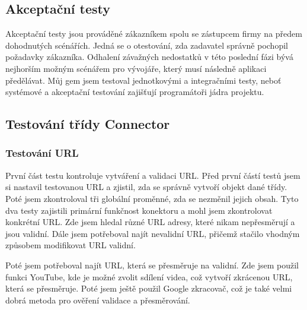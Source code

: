 \subsection{Akceptační testy}
\par Akceptační testy jsou prováděné zákazníkem spolu se zástupcem firmy na předem dohodnutých scénářích. Jedná se o otestování, zda zadavatel správně pochopil požadavky zákazníka. Odhalení závažných nedostatků v této poslední fázi bývá nejhorším možným scénářem pro vývojáře, který musí následně aplikaci předělávat. Můj gem jsem testoval jednotkovými a integračními testy, neboť systémové a akceptační testování zajišťují programátoři jádra projektu.


\subsection{Testování třídy Connector}
\subsubsection{Testování URL}
\par První část testu kontroluje vytváření a validaci URL. Před první částí testů jsem si nastavil testovanou URL a zjistil, zda se správně vytvoří objekt dané třídy. Poté jsem zkontroloval tři globální proměnné, zda se nezměnil jejich obsah. Tyto dva testy zajistili primární funkčnost konektoru a mohl jsem zkontrolovat konkrétní URL. Zde jsem hledal různé URL adresy, které nikam nepřesměrují a jsou validní. Dále jsem potřeboval najít nevalidní URL, přičemž stačilo vhodným způsobem modifikovat URL validní. 
\par Poté jsem potřeboval najít URL, která se přesměruje na validní. Zde jsem použil funkci YouTube, kde je možné zvolit sdílení videa, což vytvoří zkrácenou URL, která se přesměruje. Poté jsem ještě použil Google zkracovač, což je také velmi dobrá metoda pro ověření validace a přesměrování.

